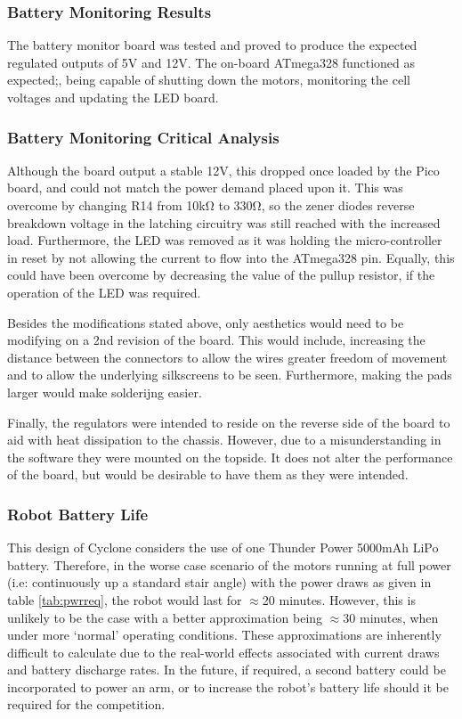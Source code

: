\subsubsection{Battery Monitoring Results}
The battery monitor board was tested and proved to produce the expected regulated outputs of 5V and 12V. The on-board ATmega328 functioned as expected;, being capable of shutting down the motors, monitoring the cell voltages and updating the LED board.\par

\subsubsection{Battery Monitoring Critical Analysis}
Although the board output a stable 12V, this dropped once loaded by the Pico board, and could not match the power demand placed upon it. This was overcome by changing R14 from 10kΩ to 330Ω, so the zener diodes reverse breakdown voltage in the latching circuitry was still reached with the increased load. Furthermore, the LED was removed as it was holding the micro-controller in reset by not allowing the current to flow into the ATmega328 pin. Equally, this could have been overcome by decreasing the value of the pullup resistor, if the operation of the LED was required.\par

Besides the modifications stated above, only aesthetics would need to be modifying on a 2nd revision of the board. This would include, increasing the distance between the connectors to allow the wires greater freedom of movement and to allow the underlying silkscreens to be seen. Furthermore, making the pads larger would make solderijng easier.\par

Finally, the regulators were intended to reside on the reverse side of the board to aid with heat dissipation to the chassis. However, due to a misunderstanding in the software they were mounted on the topside. It does not alter the performance of the board, but would be desirable to have them as they were intended.\par


\subsubsection{Robot Battery Life}
This design of Cyclone considers the use of one Thunder Power 5000mAh LiPo battery. Therefore, in the worse case scenario of the motors running at full power (i.e: continuously up a standard stair angle) with the power draws as given in table \ref{tab:pwrreq}, the robot would last for $\approx$20 minutes. However, this is unlikely to be the case with a better approximation being $\approx$30 minutes, when under more ‘normal’ operating conditions. These approximations are inherently difficult to calculate due to the real-world effects associated with current draws and battery discharge rates. In the future, if required, a second battery could be incorporated to power an arm, or to increase the robot’s battery life should it be required for the competition.\par
